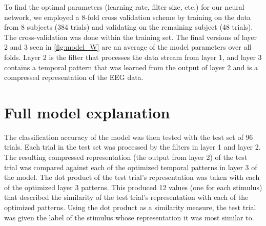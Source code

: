To find the optimal parameters (learning rate, filter size, etc.) for our neural network, we employed a 8-fold cross validation scheme by training on the data from 8 subjects (384 trials) and validating on the remaining subject (48 trials).
The cross-validation was done within the training set. %
The final versions of layer 2 and 3 seen in \autoref{fig:model_W} are an average of the model parameters over all folds.
Layer 2 is the filter that processes the data stream from layer 1, and layer 3 contains a temporal pattern that was learned from the output of layer 2 and is a compressed representation of the EEG data. 

\section{Full model explanation}
The classification accuracy of the model was then tested with the test set of 96 trials. 
Each trial in the test set was processed by the filters in layer 1 and layer 2. 
The resulting compressed representation (the output from layer 2) of the test trial was compared against each of the optimized temporal patterns in layer 3 of the model.
The dot product of the test trial's representation was taken with each of the optimized layer 3 patterns.
This produced 12 values (one for each stimulus) that described the similarity of the test trial's representation with each of the optimized patterns. 
Using the dot product as a similarity measure, the test trial was given the label of the stimulus whose representation it was most similar to. 
